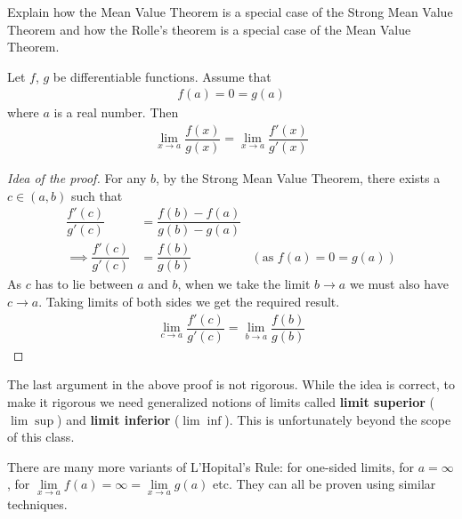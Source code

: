 \begin{exercise}
	Explain how the Mean Value Theorem is a special case of the Strong Mean Value Theorem and how the Rolle's theorem is a special case of the Mean Value Theorem.
\end{exercise}
\begin{theorem}
	Let $f$, $g$ be differentiable functions. Assume that
	\begin{align*}
		f(a) = 0 = g(a)
	\end{align*}
	where $a$ is a real number. Then
	\begin{align*}
		\lim \limits_{x \rightarrow a} \dfrac{f(x)}{g(x)} = \lim \limits_{x \rightarrow a} \dfrac{f'(x)}{g'(x)}
	\end{align*}
\end{theorem}

\begin{proof}[Idea of the proof]
	For any $b$, by the Strong Mean Value Theorem, there exists a $c \in (a,b)$ such that
	\begin{align*}
		\dfrac{f'(c)}{g'(c)}          & = \dfrac{f(b) - f(a)}{g(b) - g(a)}                                \\
		\implies \dfrac{f'(c)}{g'(c)} & = \dfrac{f(b)}{g(b)}               & (\mbox{as } f(a) = 0 = g(a))
	\end{align*}
	As $c$ has to lie between $a$ and $b$, when we take the limit $b \rightarrow a$ we must also have $c \rightarrow a$. Taking limits of both sides we get the required result.
	\begin{align*}
		\lim \limits_{c \rightarrow a} \dfrac{f'(c)}{g'(c)} = \lim \limits_{b \rightarrow a}  \dfrac{f(b)}{g(b)}
	\end{align*}
\end{proof}

\begin{remark}
	The last argument in the above proof is not rigorous. While the idea is correct, to make it rigorous we need generalized notions of limits called {\bf limit superior} ($\lim \sup$) and {\bf limit inferior} ($\lim \inf$). This is unfortunately beyond the scope of this class.
\end{remark}

There are many more variants of L'Hopital's Rule: for one-sided limits, for $a = \infty$, for $ \lim \limits_{x \rightarrow a} f(a)= \infty =\lim \limits_{x \rightarrow a} g(a) $ etc. They can all be proven using similar techniques.










